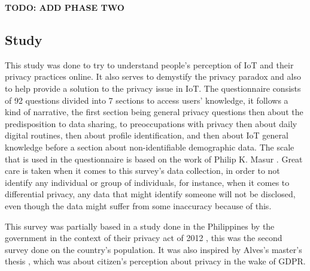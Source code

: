 \documentclass[conference]{IEEEtran}
\begin{document}
\textbf{\color{red}TODO: ADD PHASE TWO}


\subsection{Study}

This study was done to try to understand people's perception of IoT and their
privacy practices online. It also serves to demystify the privacy paradox
and also to help provide a solution to the privacy issue in IoT. The questionnaire
consists of 92 questions divided into 7 sections to access users' knowledge,
it follows a kind of narrative, the first section being general privacy
questions then about the predisposition
to data sharing, to preoccupations with privacy then about daily digital
routines, then about profile identification, and then about IoT general
knowledge before a section about non-identifiable demographic data.
The scale that is used in the questionnaire is based on the work of Philip K.
Masur \cite{masur2018situational}.
Great care is taken when it comes to this survey's data collection, in order
to not identify any individual or group of individuals, for instance, when it
comes to differential privacy, any data that might identify someone will not
be disclosed, even though the data might suffer from some inaccuracy because
of this.

This survey was partially based in a study done in the Philippines
by the government in the context of their privacy act of 2012 \cite{Philippine2022Conduct}, this was the
second survey done on the country's population. It was also inspired by
Alves's master's thesis \cite{alves2021}, which was about citizen's perception about privacy
in the wake of GDPR.
\end{document}
